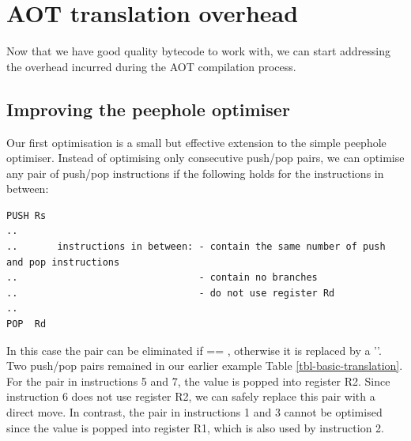 \section{AOT translation overhead}
\label{sec-optimisations-aot-translation-overhead}
Now that we have good quality bytecode to work with, we can start addressing the overhead incurred during the AOT compilation process.

\subsection{Improving the peephole optimiser}
\label{sec-improved-peephole}

Our first optimisation is a small but effective extension to the simple peephole optimiser. Instead of optimising only consecutive push/pop pairs, we can optimise any pair of push/pop instructions if the following holds for the instructions in between:

\begin{listing}[H]
 \centering
 \begin{verbatim}
PUSH Rs
..
..       instructions in between: - contain the same number of push and pop instructions
..                                - contain no branches
..                                - do not use register Rd
..
POP  Rd
 \end{verbatim}
\end{listing}

In this case the pair can be eliminated if  == , otherwise it is replaced by a ''. Two push/pop pairs remained in our earlier example Table \ref{tbl-basic-translation}. For the pair in instructions 5 and 7, the value is popped into register R2. Since instruction 6 does not use register R2, we can safely replace this pair with a direct move. In contrast, the pair in instructions 1 and 3 cannot be optimised since the value is popped into register R1, which is also used by instruction 2.


